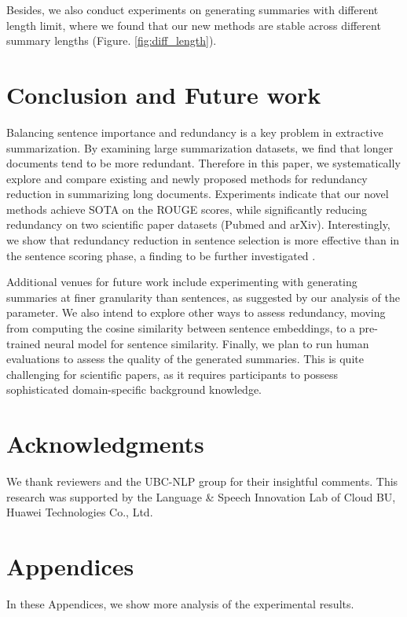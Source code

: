 \documentclass[11pt,a4paper]{article}
\begin{document}
Besides, we also conduct experiments on generating summaries with different length limit, where we found that our new methods are stable across different summary lengths (Figure. \ref{fig:diff_length}).

\section{Conclusion and Future work}
Balancing sentence importance and redundancy is a key problem in extractive summarization. By examining large summarization datasets, we find that longer documents tend to be more redundant. Therefore in this paper, we systematically explore and compare existing and newly proposed methods  for redundancy reduction in summarizing long documents. Experiments indicate that our novel methods achieve SOTA on the ROUGE scores, while significantly reducing  redundancy on two scientific paper datasets (Pubmed and arXiv). Interestingly, we show that redundancy reduction in sentence selection is more effective than in the sentence scoring phase, a finding to be further investigated . 




Additional venues for future work include experimenting with generating summaries at finer granularity than sentences, as suggested by our analysis of the  parameter. We also intend to explore other ways to assess  redundancy, moving from computing the cosine similarity between sentence embeddings, to a pre-trained neural model for sentence similarity. Finally, we plan to run human evaluations to assess the quality of the generated summaries. This is quite challenging for scientific papers, as it requires participants to possess sophisticated domain-specific background knowledge.


\section*{Acknowledgments}
\vspace{-1mm}
We thank reviewers and the UBC-NLP group for their insightful comments.
This research was supported by the Language \& Speech Innovation Lab of Cloud BU, Huawei Technologies Co., Ltd.


\appendix
\section{Appendices}
In these Appendices, we show more analysis of the experimental results. 
\end{document}
